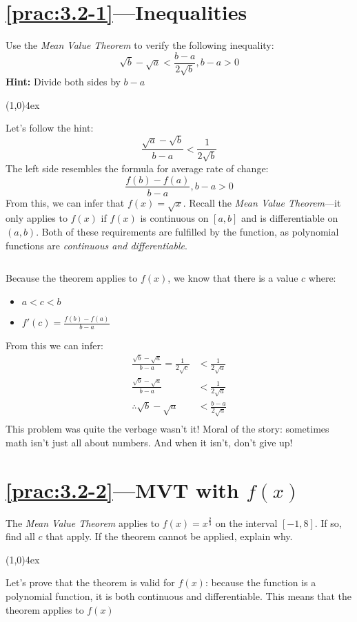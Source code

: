\documentclass{MathNotes}
\newcommand{\br}{
\begin{center}
\line(1,0){4ex}
\end{center}}
\newcommand{\bl}{
    \newline$ $\newline
}
\begin{document}
\section*{\ref{prac:3.2-1}---Inequalities}\label{ans:3.2-1}
Use the \textit{Mean Value Theorem} to verify the following inequality:
$$\sqrt{b}-\sqrt{a}<\frac{b-a}{2\sqrt{b}},b-a>0$$
\textbf{Hint:} Divide both sides by $b-a$
\br
Let's follow the hint:$$\frac{\sqrt{a}-\sqrt{b}}{b-a}<\frac{1}{2\sqrt{b}}$$
The left side resembles the formula for average rate of change:
$$\frac{f(b)-f(a)}{b-a},b-a>0$$
From this, we can infer that $f(x)=\sqrt{x}$. Recall the \textit{Mean Value 
Theorem}---it only applies to $f(x)$ if $f(x)$ is continuous on $[a, b]$ and
is differentiable on $(a, b)$. Both of these requirements are fulfilled by the
function, as polynomial functions are \textit{continuous and differentiable}.
\bl
Because the theorem applies to $f(x)$, we know that there is a value $c$ where:
\begin{multicols}{2}
\begin{itemize}
    \item $a<c<b$
    \item $f'(c)=\frac{f(b)-f(a)}{b-a}$
\end{itemize}
\end{multicols}

From this we can infer: 
\begin{align*}
    \frac{\sqrt{b}-\sqrt{a}}{b-a}=\frac{1}{2\sqrt{c}}&<\frac{1}{2\sqrt{a}}\\
    \frac{\sqrt{b}-\sqrt{a}}{b-a}&<\frac{1}{2\sqrt{a}}\\
    \therefore\sqrt{b}-\sqrt{a}&<\frac{b-a}{2\sqrt{a}}\\
\end{align*}
This problem was quite the verbage wasn't it! Moral of the story: sometimes
math isn't just all about numbers. And when it isn't, don't give up!

\section*{\ref{prac:3.2-2}---MVT with $f(x)$}\label{ans:3.2-2}
The \textit{Mean Value Theorem} applies to $f(x)=x^{\frac{2}{3}}$ on the 
interval $[-1, 8]$. If so, find all $c$ that apply. If the theorem cannot
be applied, explain why.
\br
{}
Let's prove that the theorem is valid for $f(x)$: because the function is
a polynomial function, it is both continuous and differentiable. This means
that the theorem applies to $f(x)$
\end{document}
